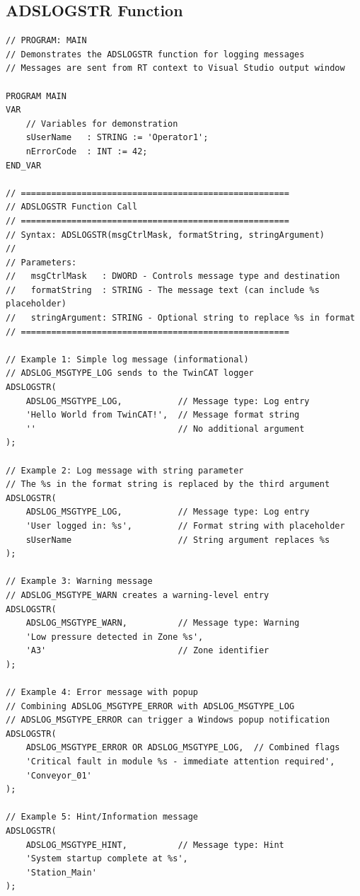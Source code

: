 \documentclass[11pt,a4paper]{article}
\begin{document}
\subsection{ADSLOGSTR Function}

\begin{lstlisting}
// PROGRAM: MAIN
// Demonstrates the ADSLOGSTR function for logging messages
// Messages are sent from RT context to Visual Studio output window

PROGRAM MAIN
VAR
    // Variables for demonstration
    sUserName   : STRING := 'Operator1';
    nErrorCode  : INT := 42;
END_VAR

// =====================================================
// ADSLOGSTR Function Call
// =====================================================
// Syntax: ADSLOGSTR(msgCtrlMask, formatString, stringArgument)
//
// Parameters:
//   msgCtrlMask   : DWORD - Controls message type and destination
//   formatString  : STRING - The message text (can include %s placeholder)
//   stringArgument: STRING - Optional string to replace %s in format
// =====================================================

// Example 1: Simple log message (informational)
// ADSLOG_MSGTYPE_LOG sends to the TwinCAT logger
ADSLOGSTR(
    ADSLOG_MSGTYPE_LOG,           // Message type: Log entry
    'Hello World from TwinCAT!',  // Message format string
    ''                            // No additional argument
);

// Example 2: Log message with string parameter
// The %s in the format string is replaced by the third argument
ADSLOGSTR(
    ADSLOG_MSGTYPE_LOG,           // Message type: Log entry
    'User logged in: %s',         // Format string with placeholder
    sUserName                     // String argument replaces %s
);

// Example 3: Warning message
// ADSLOG_MSGTYPE_WARN creates a warning-level entry
ADSLOGSTR(
    ADSLOG_MSGTYPE_WARN,          // Message type: Warning
    'Low pressure detected in Zone %s',
    'A3'                          // Zone identifier
);

// Example 4: Error message with popup
// Combining ADSLOG_MSGTYPE_ERROR with ADSLOG_MSGTYPE_LOG
// ADSLOG_MSGTYPE_ERROR can trigger a Windows popup notification
ADSLOGSTR(
    ADSLOG_MSGTYPE_ERROR OR ADSLOG_MSGTYPE_LOG,  // Combined flags
    'Critical fault in module %s - immediate attention required',
    'Conveyor_01'
);

// Example 5: Hint/Information message
ADSLOGSTR(
    ADSLOG_MSGTYPE_HINT,          // Message type: Hint
    'System startup complete at %s',
    'Station_Main'
);
\end{lstlisting}
\end{document}
